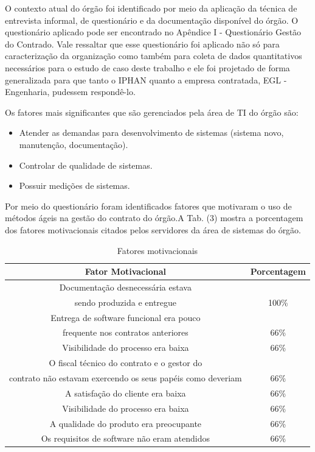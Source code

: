 O contexto atual do órgão foi identificado por meio da aplicação da técnica de entrevista informal, de questionário e da documentação disponível do órgão. O questionário aplicado pode ser encontrado no Apêndice I - Questionário Gestão do Contrado. Vale ressaltar que esse questionário foi aplicado não só para caracterização da organização como também para coleta de dados quantitativos necessários para o estudo de caso deste trabalho e ele foi projetado de forma generalizada para que tanto o IPHAN quanto a empresa contratada, EGL - Engenharia, pudessem respondê-lo.
 
Os fatores mais significantes que são gerenciados pela área de TI do órgão são:
\begin{itemize}
\item Atender as demandas para desenvolvimento de sistemas (sistema novo, manutenção, documentação).
\item Controlar de qualidade de sistemas.
\item Possuir medições de sistemas.
\end{itemize}

Por meio do questionário foram identificados fatores que motivaram o uso de métodos ágeis na gestão do contrato do órgão.A Tab. (3) mostra a porcentagem dos fatores motivacionais citados pelos servidores da área de sistemas do órgão. 

\begin{table}[H]
\center
\footnotesize
\begin{tabular}{|c|c|}
\hline
\textbf{Fator Motivacional}          & \textbf{Porcentagem}  \\ \hline
Documentação desnecessária estava \\ sendo produzida e entregue               &  100\%                 \\ \hline
Entrega de software funcional era pouco \\ frequente nos contratos anteriores        &  66\%                  \\ \hline
Visibilidade do processo era baixa              &  66\%                \\ \hline
O fiscal técnico do contrato e o gestor do \\ contrato não estavam exercendo os seus papéis como deveriam              &  66\%                \\ \hline
A satisfação do cliente era baixa              &  66\%                \\ \hline
Visibilidade do processo era baixa              &  66\%                \\ \hline
A qualidade do produto era preocupante   &  66\%                \\ \hline
Os requisitos de software não eram atendidos &  66\%                \\ \hline
\end{tabular}
\caption{Fatores motivacionais}
\end{table}


